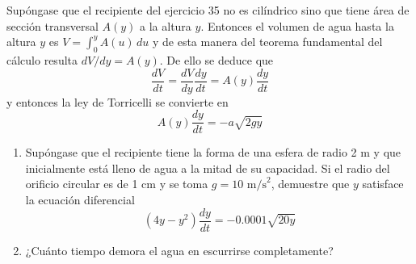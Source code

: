 \item Supóngase que el recipiente del ejercicio 35 no es cilíndrico sino que tiene área de sección transversal $A(y)$ a la altura $y$. Entonces el volumen de agua hasta la altura $y$ es $V = \int_0^y A(u) \, du$ y de esta manera del teorema fundamental del cálculo resulta $dV/dy = A(y)$. De ello se deduce que
    \[ \frac{dV}{dt} = \frac{dV}{dy} \frac{dy}{dt} = A(y) \frac{dy}{dt} \]
    y entonces la ley de Torricelli se convierte en
    \[ A(y) \frac{dy}{dt} = -a \sqrt{2gy} \]
    \begin{enumerate}
        \item[(a)] Supóngase que el recipiente tiene la forma de una esfera de radio 2 m y que inicialmente está lleno de agua a la mitad de su capacidad. Si el radio del orificio circular es de 1 cm y se toma $g = 10 \text{ m/s}^2$, demuestre que $y$ satisface la ecuación diferencial
        \[ (4y - y^2) \frac{dy}{dt} = -0.0001 \sqrt{20y} \]
        \item[(b)] ¿Cuánto tiempo demora el agua en escurrirse completamente?
    \end{enumerate}
